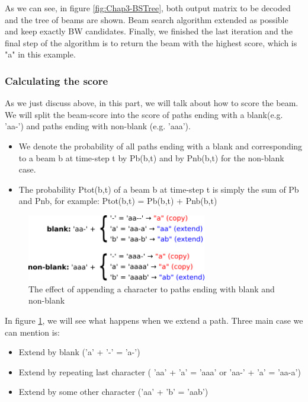 As we can see, in figure \ref{fig:Chap3-BSTree}, both output matrix to be decoded and the tree of beams are shown.
Beam search algorithm extended as possible and keep exactly BW candidates. Finally,
we finished the last iteration and the final step of the algorithm is to return the beam
with the highest score, which is "a" in this example.

\subsubsection{Calculating the score}
As we just discuss above, in this part, we will talk about how to score the beam.
We will split the beam-score into the score of paths ending with a blank(e.g. 'aa-')
and paths ending with non-blank (e.g. 'aaa').
\begin{itemize}
	\item We denote the probability of all paths ending with a blank and corresponding to a beam b at time-step t
	      by Pb(b,t) and by Pnb(b,t) for the non-blank case.
	\item The probability Ptot(b,t) of a beam b at time-step t is simply the sum of Pb and Pnb, for example:
	      Ptot(b,t) = Pb(b,t) + Pnb(b,t)
\end{itemize}

\begin{figure}[H]
	\centering
	\includegraphics[width=0.7\textwidth]{img/Chap3/CTC_Scoring}
	\caption{ The effect of appending a character to paths ending with blank and non-blank }
	\label{fig:Chap3-CTC_Scoring}
\end{figure}

In figure \ref{fig:Chap3-CTC_Scoring}, we will see what happens when we extend a path. Three main case we can mention
is:
\begin{itemize}
	\item Extend by blank ('a' + '-' = 'a-')
	\item Extend by repeating last character ( 'aa' + 'a' = 'aaa' or 'aa-' + 'a' = 'aa-a')
	\item Extend by some other character ('aa' + 'b' = 'aab')
\end{itemize}


